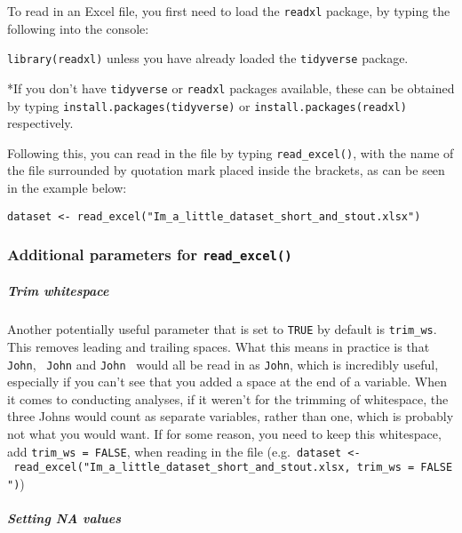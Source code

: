 \documentclass[
]{article}
\begin{document}
To read in an Excel file, you first need to load the \texttt{readxl}
package, by typing the following into the console:

\texttt{library(readxl)} unless you have already loaded the
\texttt{tidyverse} package.

*If you don't have \texttt{tidyverse} or \texttt{readxl} packages
available, these can be obtained by typing
\texttt{install.packages(\textquotesingle{}tidyverse\textquotesingle{})}
or \texttt{install.packages(\textquotesingle{}readxl\textquotesingle{})}
respectively.

Following this, you can read in the file by typing
\texttt{read\_excel()}, with the name of the file surrounded by
quotation mark placed inside the brackets, as can be seen in the example
below:

\texttt{dataset\ \textless{}-\ read\_excel("Im\_a\_little\_dataset\_short\_and\_stout.xlsx")}

\hypertarget{additional-parameters-for-read_excel}{%
\subsubsection{\texorpdfstring{Additional parameters for
\texttt{read\_excel()}}{Additional parameters for read\_excel()}}\label{additional-parameters-for-read_excel}}

\hypertarget{trim-whitespace-1}{%
\subparagraph{Trim whitespace}\label{trim-whitespace-1}}

Another potentially useful parameter that is set to \texttt{TRUE} by
default is \texttt{trim\_ws}. This removes leading and trailing spaces.
What this means in practice is that
\texttt{\textquotesingle{}John\textquotesingle{}},
\texttt{\textquotesingle{}\ John\textquotesingle{}} and
\texttt{\textquotesingle{}John\ \textquotesingle{}} would all be read in
as \texttt{\textquotesingle{}John\textquotesingle{}}, which is
incredibly useful, especially if you can't see that you added a space at
the end of a variable. When it comes to conducting analyses, if it
weren't for the trimming of whitespace, the three Johns would count as
separate variables, rather than one, which is probably not what you
would want. If for some reason, you need to keep this whitespace, add
\texttt{trim\_ws\ =\ FALSE}, when reading in the file
(e.g.~\texttt{dataset\ \textless{}-\ read\_excel("Im\_a\_little\_dataset\_short\_and\_stout.xlsx,\ trim\_ws\ =\ FALSE")})

\hypertarget{setting-na-values-1}{%
\subparagraph{Setting NA values}\label{setting-na-values-1}}
\end{document}
